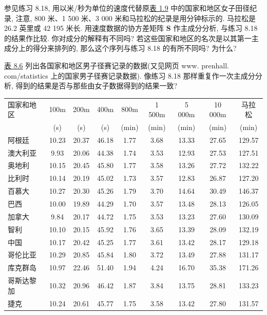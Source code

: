 
\quad 参见练习 8.18, 用以米/秒为单位的速度代替原\hyperref[tab:1.9]{表 1.9} 中的国家和地区女子田径纪录, 注意, 800 米、1 500 米、3 000 米和马拉松的纪录是用分钟标示的. 马拉松是 26.2 英里或 42 195 米长. 用速度数据的协方差矩阵 $\mathbf{S}$ 作主成分分析, 与练习 8.18 的结果作比较. 你对成分的解释有不同吗? 若这些国家和地区的名次是以其第一主成分上的得分来排列的, 那么这个序列与练习 8.18 的有所不同吗? 为什么?

\quad \hyperref[tab:8.6]{表 8.6} 列出各国家和地区男子径赛记录的数据(又见网页 www. prenhall. com/statistics 上的国家男子径赛记录数据). 像练习 8.18 那样重复作一次主成分分析, 得到的结果是否与那些由女子数据得到的结果一致?

\begin{mvtable}
\label{tab:8.6}
\begin{tabular}{lcccccccc}
\toprule
国家和地区 & 100m & 200m & 400m & 800m & 1 500m & 5 000m & 10 000m & 马拉松 \\
 & (s) & (s) & (s) & (min) & (min) & (min) & (min) & (min) \\
\midrule
阿根廷 & 10.23 & 20.37 & 46.18 & 1.77 & 3.68 & 13.33 & 27.65 & 129.57 \\
澳大利亚 & 9.93 & 20.06 & 44.38 & 1.74 & 3.53 & 12.93 & 27.53 & 127.51 \\
奥地利 & 10.15 & 20.45 & 45.80 & 1.77 & 3.58 & 13.26 & 27.72 & 132.22 \\
比利时 & 10.14 & 20.19 & 45.02 & 1.73 & 3.57 & 12.83 & 26.87 & 127.20 \\
百慕大 & 10.27 & 20.30 & 45.26 & 1.79 & 3.70 & 14.64 & 30.49 & 146.37 \\
巴西 & 10.00 & 19.89 & 44.29 & 1.70 & 3.57 & 13.48 & 28.13 & 126.05 \\
加拿大 & 9.84 & 20.17 & 44.72 & 1.75 & 3.53 & 13.23 & 27.60 & 130.09 \\
智利 & 10.10 & 20.15 & 45.92 & 1.76 & 3.65 & 13.39 & 28.09 & 132.19 \\
中国 & 10.17 & 20.42 & 45.25 & 1.77 & 3.61 & 13.42 & 28.17 & 129.18 \\
哥伦比亚 & 10.29 & 20.85 & 45.84 & 1.80 & 3.72 & 13.49 & 27.88 & 131.17 \\
库克群岛 & 10.97 & 22.46 & 51.40 & 1.94 & 4.24 & 16.70 & 35.38 & 171.26 \\
哥斯达黎加 & 10.32 & 20.96 & 46.42 & 1.87 & 3.84 & 13.75 & 28.81 & 133.23 \\
捷克 & 10.24 & 20.61 & 45.77 & 1.75 & 3.58 & 13.42 & 27.80 & 131.57 \\

\end{tabular}
\end{mvtable}

